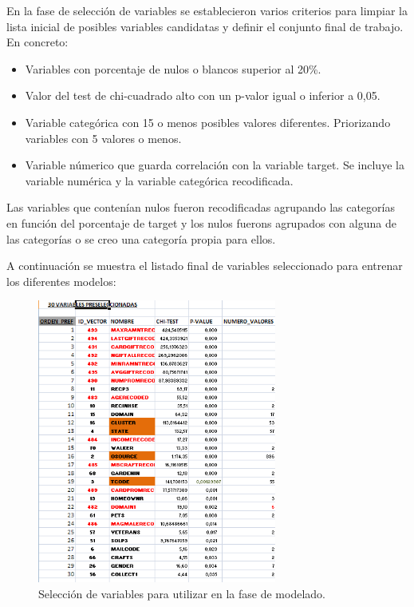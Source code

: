 En la fase de selección de variables se establecieron varios criterios para limpiar la lista inicial de posibles variables candidatas y definir el conjunto final de trabajo. En concreto:

\begin{itemize}

\item{Variables con porcentaje de nulos o blancos superior al 20\%.}
\item{Valor del test de chi-cuadrado alto con un p-valor igual o inferior a 0,05.}
\item{Variable categórica con 15 o menos posibles valores diferentes. Priorizando variables con 5 valores o menos.}
\item{Variable númerico que guarda correlación con la variable target. Se incluye la variable numérica y la variable categórica recodificada.}

\end{itemize}

Las variables que contenían nulos fueron recodificadas agrupando las categorías en función del porcentaje de target y los nulos fuerons agrupados con alguna de las categorías o se creo una categoría propia para ellos.

A continuación se muestra el listado final de variables seleccionado para entrenar los diferentes modelos:

\begin{figure}[H]
\begin{center}
\includegraphics[width=0.7\textwidth]{img/seleccion}
\caption{Selección de variables para utilizar en la fase de modelado.}
\end{center}
\end{figure}


